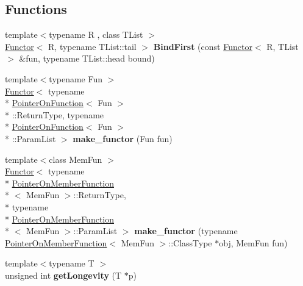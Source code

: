 \subsection*{Functions}
\begin{DoxyCompactItemize}
\item 
\hypertarget{namespaceutilspp_ac5b4bc2a2502140da2defa690269b717}{{\footnotesize template$<$typename R , class T\-List $>$ }\\\hyperlink{classutilspp_1_1Functor}{Functor}$<$ R, typename T\-List\-::tail $>$ {\bfseries Bind\-First} (const \hyperlink{classutilspp_1_1Functor}{Functor}$<$ R, T\-List $>$ \&fun, typename T\-List\-::head bound)}\label{namespaceutilspp_ac5b4bc2a2502140da2defa690269b717}

\item 
\hypertarget{namespaceutilspp_ae99ec0a0fb0b18e0eb7f923381134606}{{\footnotesize template$<$typename Fun $>$ }\\\hyperlink{classutilspp_1_1Functor}{Functor}$<$ typename \\*
\hyperlink{structutilspp_1_1PointerOnFunction}{Pointer\-On\-Function}$<$ Fun $>$\\*
\-::Return\-Type, typename \\*
\hyperlink{structutilspp_1_1PointerOnFunction}{Pointer\-On\-Function}$<$ Fun $>$\\*
\-::Param\-List $>$ {\bfseries make\-\_\-functor} (Fun fun)}\label{namespaceutilspp_ae99ec0a0fb0b18e0eb7f923381134606}

\item 
\hypertarget{namespaceutilspp_aa4eade744c2430f3120af78bce7879cf}{{\footnotesize template$<$class Mem\-Fun $>$ }\\\hyperlink{classutilspp_1_1Functor}{Functor}$<$ typename \\*
\hyperlink{structutilspp_1_1PointerOnMemberFunction}{Pointer\-On\-Member\-Function}\\*
$<$ Mem\-Fun $>$\-::Return\-Type, \\*
typename \\*
\hyperlink{structutilspp_1_1PointerOnMemberFunction}{Pointer\-On\-Member\-Function}\\*
$<$ Mem\-Fun $>$\-::Param\-List $>$ {\bfseries make\-\_\-functor} (typename \hyperlink{structutilspp_1_1PointerOnMemberFunction}{Pointer\-On\-Member\-Function}$<$ Mem\-Fun $>$\-::Class\-Type $\ast$obj, Mem\-Fun fun)}\label{namespaceutilspp_aa4eade744c2430f3120af78bce7879cf}

\item 
\hypertarget{namespaceutilspp_a23f8d87a675dc506f9388be799780f59}{{\footnotesize template$<$typename T $>$ }\\unsigned int {\bfseries get\-Longevity} (T $\ast$p)}\label{namespaceutilspp_a23f8d87a675dc506f9388be799780f59}


\end{DoxyCompactItemize}
